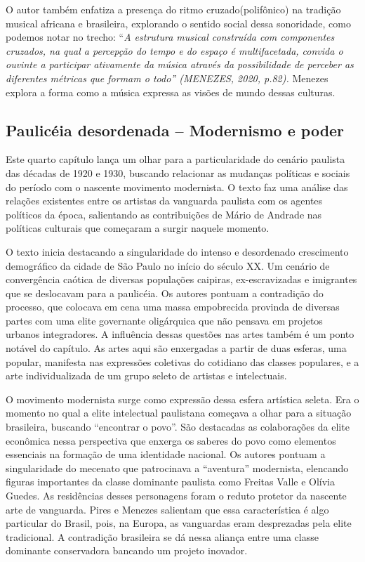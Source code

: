 O autor também enfatiza a presença do ritmo cruzado(polifônico) na
tradição musical africana e brasileira, explorando o sentido social
dessa sonoridade, como podemos notar no trecho: ``\emph{A estrutura
musical construída com componentes cruzados, na qual a percepção do
tempo e do espaço é multifacetada, convida o ouvinte a participar
ativamente da música através da possibilidade de perceber as diferentes
métricas que formam o todo'' (MENEZES, 2020, p.82).} Menezes explora a
forma como a música expressa as visões de mundo dessas culturas.

\subsection{Paulicéia desordenada -- Modernismo e poder}

Este quarto capítulo lança um olhar para a particularidade do cenário
paulista das décadas de 1920 e 1930, buscando relacionar as mudanças
políticas e sociais do período com o nascente movimento modernista. O
texto faz uma análise das relações existentes entre os artistas da
vanguarda paulista com os agentes políticos da época, salientando as
contribuições de Mário de Andrade nas políticas culturais que começaram
a surgir naquele momento.

O texto inicia destacando a singularidade do intenso e desordenado
crescimento demográfico da cidade de São Paulo no início do século XX.
Um cenário de convergência caótica de diversas populações caipiras,
ex-escravizadas e imigrantes que se deslocavam para a paulicéia. Os
autores pontuam a contradição do processo, que colocava em cena uma
massa empobrecida provinda de diversas partes com uma elite governante
oligárquica que não pensava em projetos urbanos integradores. A
influência dessas questões nas artes também é um ponto notável do
capítulo. As artes aqui são enxergadas a partir de duas esferas, uma
popular, manifesta nas expressões coletivas do cotidiano das classes
populares, e a arte individualizada de um grupo seleto de artistas e
intelectuais.

O movimento modernista surge como expressão dessa esfera artística
seleta. Era o momento no qual a elite intelectual paulistana começava a
olhar para a situação brasileira, buscando ``encontrar o povo''. São
destacadas as colaborações da elite econômica nessa perspectiva que
enxerga os saberes do povo como elementos essenciais na formação de uma
identidade nacional. Os autores pontuam a singularidade do mecenato que
patrocinava a ``aventura'' modernista, elencando figuras importantes da
classe dominante paulista como Freitas Valle e Olívia Guedes. As
residências desses personagens foram o reduto protetor da nascente arte
de vanguarda. Pires e Menezes salientam que essa característica é algo
particular do Brasil, pois, na Europa, as vanguardas eram desprezadas
pela elite tradicional. A contradição brasileira se dá nessa aliança
entre uma classe dominante conservadora bancando um projeto inovador.

